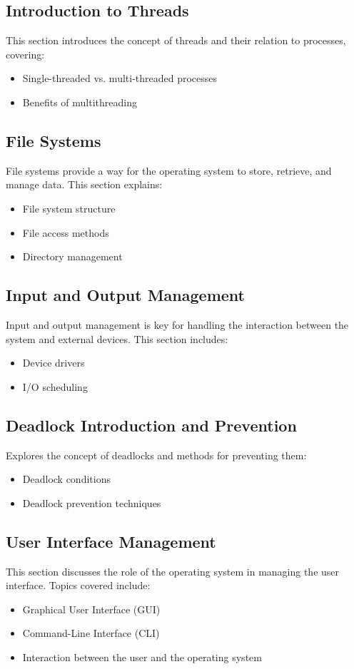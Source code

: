 \documentclass[12pt]{article}
\begin{document}
\subsection{Introduction to Threads}
This section introduces the concept of threads and their relation to processes, covering:
\begin{itemize}
    \item Single-threaded vs. multi-threaded processes
    \item Benefits of multithreading
\end{itemize}

\subsection{File Systems}
File systems provide a way for the operating system to store, retrieve, and manage data. This section explains:
\begin{itemize}
    \item File system structure
    \item File access methods
    \item Directory management
\end{itemize}

\subsection{Input and Output Management}
Input and output management is key for handling the interaction between the system and external devices. This section includes:
\begin{itemize}
    \item Device drivers
    \item I/O scheduling
\end{itemize}

\subsection{Deadlock Introduction and Prevention}
Explores the concept of deadlocks and methods for preventing them:
\begin{itemize}
    \item Deadlock conditions
    \item Deadlock prevention techniques
\end{itemize}

\subsection{User Interface Management}
This section discusses the role of the operating system in managing the user interface. Topics covered include:
\begin{itemize}
    \item Graphical User Interface (GUI)
    \item Command-Line Interface (CLI)
    \item Interaction between the user and the operating system
\end{itemize}
\end{document}
